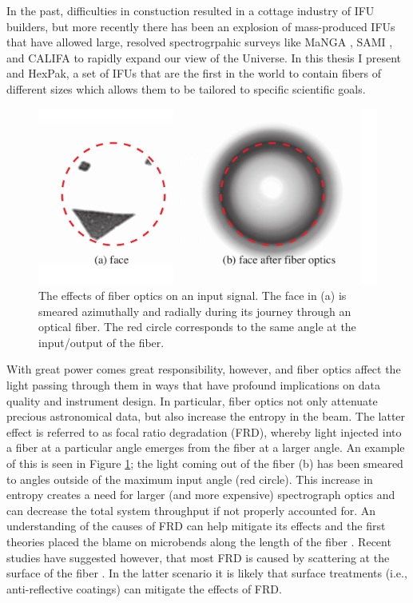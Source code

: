 In the past, difficulties in constuction resulted in a cottage
industry of IFU builders, but more recently there has been an
explosion of mass-produced IFUs that have allowed large, resolved
spectrogrpahic surveys like MaNGA \citep{Bundy15}, SAMI \citep{Croom12},
and CALIFA \citep{Sanchez12} to rapidly expand our view of the Universe. In
this thesis I present \GP and HexPak, a set of IFUs that are the first
in the world to contain fibers of different sizes which allows them to
be tailored to specific scientific goals.

\begin{figure}
  \centering
  \includegraphics[width=\textwidth]{Introduction/figs/FRDude.pdf}
  \caption[Face on FRD]{\fixspacing\label{intro:fig:FRDude}The effects
    of fiber optics on an input signal. The face in (a) is smeared
    azimuthally and radially during its journey through an optical
    fiber. The red circle corresponds to the same angle at the
    input/output of the fiber.}
\end{figure}

With great power comes great responsibility, however, and fiber optics
affect the light passing through them in ways that have profound
implications on data quality and instrument design. In particular,
fiber optics not only attenuate precious astronomical data, but also
increase the entropy in the beam. The latter effect is referred to as
focal ratio degradation (FRD), whereby light injected into a fiber at
a particular angle emerges from the fiber at a larger angle. An
example of this is seen in Figure \ref{intro:fig:FRDude}; the light
coming out of the fiber (b) has been smeared to angles outside of the
maximum input angle (red circle). This increase in entropy creates a
need for larger (and more expensive) spectrograph optics and can
decrease the total system throughput if not properly accounted for. An
understanding of the causes of FRD can help mitigate its effects and
the first theories placed the blame on microbends along the length of
the fiber \cite{Gloge72,Carrasco94}. Recent studies have suggested
however, that most FRD is caused by scattering at the surface of the
fiber \citep{Avila98,Haynes11,Eigenbrot12}. In the latter scenario it
is likely that surface treatments (i.e., anti-reflective coatings) can
mitigate the effects of FRD.

\clearpage
{} %




